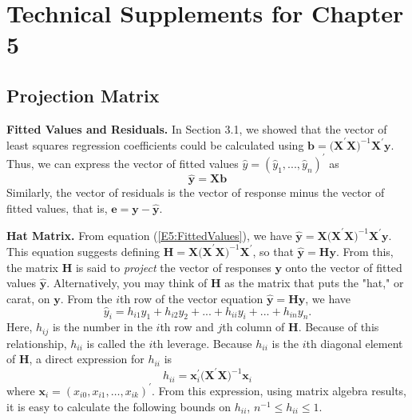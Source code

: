 \newpage

\section{Technical Supplements for Chapter 5}

\subsection{Projection Matrix}

\textbf{Fitted Values and Residuals.} In Section 3.1, we showed that
the vector of least squares regression coefficients could be
calculated using $\mathbf{b}=\mathbf{(X}^{\prime }\mathbf{X)}^{-1}\mathbf{X}^{\prime }\mathbf{y%
}$. Thus, we can express the vector of fitted values $\hat{y}=(\hat{y}%
_{1},...,\hat{y}_{n})^{\prime }$ as
\begin{equation}\label{E5:FittedValues}
\mathbf{\hat{y}}=\mathbf{Xb}
\end{equation}
Similarly, the vector of residuals is the vector of response minus
the vector of fitted values, that is,
$\mathbf{e}=\mathbf{y-\hat{y}}$.

\textbf{Hat Matrix.} From equation (\ref{E5:FittedValues}), we have $\mathbf{\hat{y}}=%
\mathbf{X(X}^{\prime }\mathbf{X)}^{-1}\mathbf{X}^{\prime
}\mathbf{y}$. This
equation suggests defining $\mathbf{H}=\mathbf{X(X}^{\prime }\mathbf{X)}^{-1}%
\mathbf{X}^{\prime }$, so that $\mathbf{\hat{y}}=\mathbf{Hy}$. From this,
the matrix $\mathbf{H}$ is said to \textit{project} the vector of responses $%
\mathbf{y}$ onto the vector of fitted values $\mathbf{\hat{y}}$.
Alternatively, you may think of $\mathbf{H}$ as the matrix that puts
the
"hat," or carat, on $\mathbf{y}$. From the $i$th row of the vector equation $%
\mathbf{\hat{y}=Hy}$, we have
\begin{equation*}
\hat{y}_{i}=h_{i1}y_{1}+h_{i2}y_{2}+...+h_{ii}y_{i}+...+h_{in}y_{n}.
\end{equation*}
Here, $h_{ij}$ is the number in the $i$th row and $j$th column of
$\mathbf{H} $. Because of this relationship, $h_{ii}$ is called
the $i$th leverage. Because $h_{ii}$ is the $i$th diagonal element of $%
\mathbf{H}$, a direct expression for $h_{ii}$ is
\begin{equation}\label{E5:Leverage}
h_{ii}=\mathbf{x}_{i}^{\prime }\mathbf{(X}^{\prime }\mathbf{X)}^{-1}\mathbf{x%
}_{i}
\end{equation} where
$\mathbf{x}_{i}=(x_{i0},x_{i1},\ldots,x_{ik})^{\prime }$. From this
expression, using matrix algebra results, it is easy to calculate
the following bounds on $h_{ii}$, $ n^{-1}\leq h_{ii}\leq 1.$

